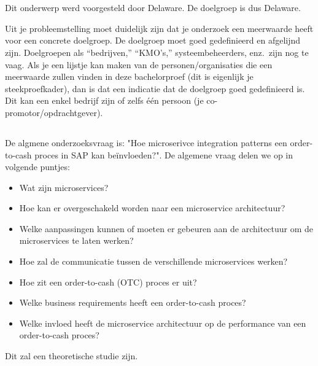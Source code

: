 
\chapter{}
\label{ch:inleiding}

\section{}
\label{sec:probleemstelling}
Dit onderwerp werd voorgesteld door Delaware. De doelgroep is dus Delaware.

Uit je probleemstelling moet duidelijk zijn dat je onderzoek een meerwaarde heeft voor een concrete doelgroep. De doelgroep moet goed gedefinieerd en afgelijnd zijn. Doelgroepen als ``bedrijven,'' ``KMO's,'' systeembeheerders, enz.~zijn nog te vaag. Als je een lijstje kan maken van de personen/organisaties die een meerwaarde zullen vinden in deze bachelorproef (dit is eigenlijk je steekproefkader), dan is dat een indicatie dat de doelgroep goed gedefinieerd is. Dit kan een enkel bedrijf zijn of zelfs één persoon (je co-promotor/opdrachtgever).

\section{}
\label{sec:onderzoeksvraag}
De algmene onderzoeksvraag is: "Hoe microserivce integration patterns een order-to-cash proces in SAP kan beïnvloeden?". De algemene vraag delen we op in volgende puntjes:
\begin{itemize}
  \item Wat zijn microservices?
  \item Hoe kan er overgeschakeld worden naar een microservice architectuur?
  \item Welke aanpassingen kunnen of moeten er gebeuren aan de architectuur om de microservices te laten werken?
  \item Hoe zal de communicatie tussen de verschillende microservices werken?
  \item Hoe zit een order-to-cash (OTC) proces er uit?
  \item Welke business requirements heeft een order-to-cash proces?
  \item Welke invloed heeft de microservice architectuur op de performance van een order-to-cash proces?
\end{itemize}
Dit zal een theoretische studie zijn.

